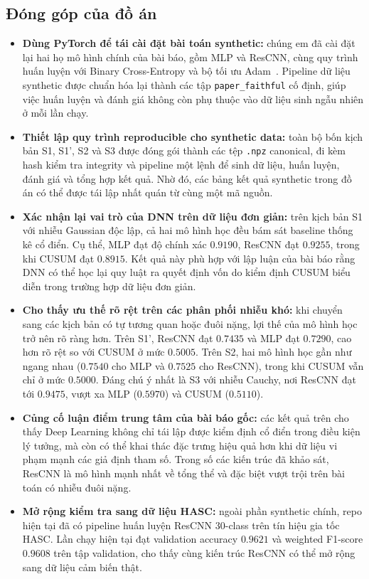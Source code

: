 \subsection*{Đóng góp của đồ án}
\begin{itemize}
    \item \textbf{Dùng PyTorch để tái cài đặt bài toán synthetic:} chúng em đã cài đặt lại hai 
    họ mô hình chính của bài báo, gồm MLP và ResCNN, cùng quy trình huấn luyện với 
    Binary Cross-Entropy và bộ tối ưu Adam~\cite{kingma2015adam}. 
    Pipeline dữ liệu synthetic được chuẩn hóa lại thành các tập \texttt{paper\_faithful} cố định, 
    giúp việc huấn luyện và đánh giá không còn phụ thuộc vào dữ liệu sinh ngẫu nhiên ở mỗi lần chạy.
    \item \textbf{Thiết lập quy trình reproducible cho synthetic data:} toàn bộ bốn kịch bản S1, S1', S2 và 
    S3 được đóng gói thành các tệp \texttt{.npz} canonical, 
    đi kèm hash kiểm tra integrity và pipeline một lệnh để sinh dữ liệu, 
    huấn luyện, đánh giá và tổng hợp kết quả. Nhờ đó, các bảng kết quả synthetic trong đồ án có thể 
    được tái lập nhất quán từ cùng một mã nguồn.
    \item \textbf{Xác nhận lại vai trò của DNN trên dữ liệu đơn giản:} trên kịch bản S1 
    với nhiễu Gaussian độc lập, cả hai mô hình học đều bám sát baseline thống kê cổ điển. 
    Cụ thể, MLP đạt độ chính xác $0.9190$, ResCNN đạt $0.9255$, trong khi CUSUM đạt $0.8915$. 
    Kết quả này phù hợp với lập luận của bài báo rằng DNN có thể học lại 
    quy luật ra quyết định vốn do kiểm định CUSUM biểu diễn trong trường hợp 
    dữ liệu đơn giản.
    \item \textbf{Cho thấy ưu thế rõ rệt trên các phân phối nhiễu khó:} khi chuyển sang các kịch bản 
    có tự tương quan hoặc đuôi nặng, lợi thế của mô hình học trở nên rõ ràng hơn. 
    Trên S1', ResCNN đạt $0.7435$ và MLP đạt $0.7290$, cao hơn rõ rệt so với CUSUM ở mức $0.5005$. 
    Trên S2, hai mô hình học gần như ngang nhau ($0.7540$ cho MLP và $0.7525$ cho ResCNN), 
    trong khi CUSUM vẫn chỉ ở mức $0.5000$. Đáng chú ý nhất là S3 với nhiễu Cauchy, 
    nơi ResCNN đạt tới $0.9475$, vượt xa MLP ($0.5970$) và CUSUM ($0.5110$).
    \item \textbf{Củng cố luận điểm trung tâm của bài báo gốc:} các kết quả trên cho thấy Deep Learning 
    không chỉ tái lập được kiểm định cổ điển trong điều kiện lý tưởng, 
    mà còn có thể khai thác đặc trưng hiệu quả hơn khi dữ liệu vi phạm mạnh các giả định tham số. 
    Trong số các kiến trúc đã khảo sát, ResCNN là mô hình mạnh nhất về tổng thể và 
    đặc biệt vượt trội trên bài toán có nhiễu đuôi nặng.
    \item \textbf{Mở rộng kiểm tra sang dữ liệu HASC:} ngoài phần synthetic chính, repo hiện tại đã có pipeline
    huấn luyện ResCNN 30-class trên tín hiệu gia tốc HASC.
    Lần chạy hiện tại đạt validation accuracy $0.9621$ và weighted F1-score $0.9608$ trên tập validation,
    cho thấy cùng kiến trúc ResCNN có thể mở rộng sang dữ liệu cảm biến thật.
\end{itemize}


